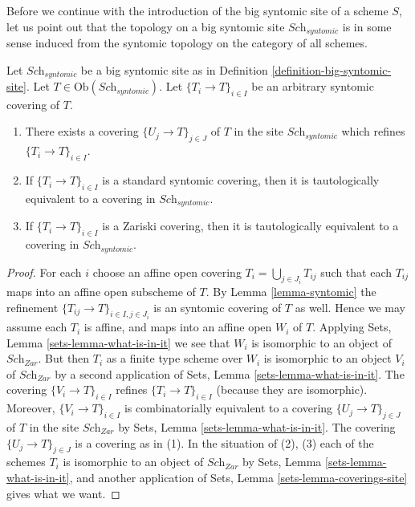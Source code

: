 \medskip\noindent
Before we continue with the introduction of the big syntomic site of
a scheme $S$, let us point out that the topology on a big syntomic site
$\textit{Sch}_{syntomic}$ is in some sense induced from the syntomic topology
on the category of all schemes.

\begin{lemma}
\label{lemma-syntomic-induced}
Let $\textit{Sch}_{syntomic}$ be a big syntomic site as in
Definition \ref{definition-big-syntomic-site}.
Let $T \in \text{Ob}(\textit{Sch}_{syntomic})$.
Let $\{T_i \to T\}_{i \in I}$ be an arbitrary syntomic covering of $T$.
\begin{enumerate}
\item There exists a covering $\{U_j \to T\}_{j \in J}$ of $T$ in the site
$\textit{Sch}_{syntomic}$ which refines $\{T_i \to T\}_{i \in I}$.
\item If $\{T_i \to T\}_{i \in I}$ is a standard syntomic covering, then
it is tautologically equivalent to a covering in $\textit{Sch}_{syntomic}$.
\item If $\{T_i \to T\}_{i \in I}$ is a Zariski covering, then
it is tautologically equivalent to a covering in $\textit{Sch}_{syntomic}$.
\end{enumerate}
\end{lemma}

\begin{proof}
For each $i$ choose an affine open covering $T_i = \bigcup_{j \in J_i} T_{ij}$
such that each $T_{ij}$ maps into an affine open subscheme of $T$. By
Lemma \ref{lemma-syntomic}
the refinement $\{T_{ij} \to T\}_{i \in I, j \in J_i}$ is an syntomic covering
of $T$ as well. Hence we may assume each $T_i$ is affine, and maps into
an affine open $W_i$ of $T$. Applying
Sets, Lemma \ref{sets-lemma-what-is-in-it}
we see that $W_i$ is isomorphic to an object of $\textit{Sch}_{Zar}$.
But then $T_i$ as a finite type scheme over $W_i$
is isomorphic to an object $V_i$ of $\textit{Sch}_{Zar}$ by a second
application of
Sets, Lemma \ref{sets-lemma-what-is-in-it}.
The covering $\{V_i \to T\}_{i \in I}$ refines $\{T_i \to T\}_{i \in I}$
(because they are isomorphic).
Moreover, $\{V_i \to T\}_{i \in I}$ is combinatorially equivalent to a
covering $\{U_j \to T\}_{j \in J}$ of $T$ in the site
$\textit{Sch}_{Zar}$ by
Sets, Lemma \ref{sets-lemma-what-is-in-it}.
The covering $\{U_j \to T\}_{j \in J}$ is a covering as in (1).
In the situation of (2), (3) each of the
schemes $T_i$ is isomorphic to an object of $\textit{Sch}_{Zar}$ by
Sets, Lemma \ref{sets-lemma-what-is-in-it},
and another application of
Sets, Lemma \ref{sets-lemma-coverings-site}
gives what we want.
\end{proof}

